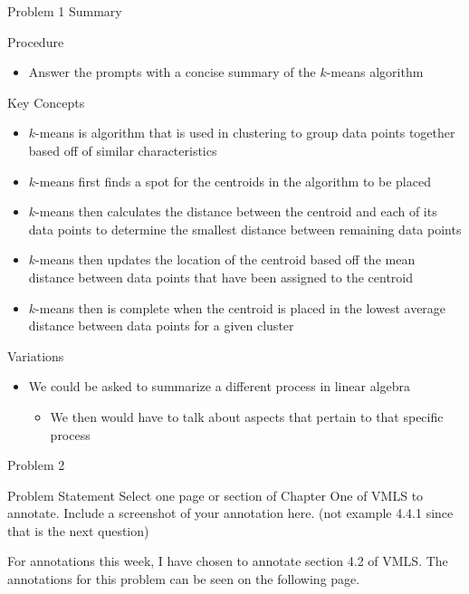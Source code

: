 \begin{summary}{Problem 1 Summary}
    \begin{statement}{Procedure}
        \begin{itemize}
            \item Answer the prompts with a concise summary of the $k$-means algorithm
        \end{itemize}
    \end{statement}
    \begin{statement}{Key Concepts}
        \begin{itemize}
            \item $k$-means is algorithm that is used in clustering to group data points together based off of similar characteristics
            \item $k$-means first finds a spot for the centroids in the algorithm to be placed
            \item $k$-means then calculates the distance between the centroid and each of its data points to determine the smallest distance between remaining data points
            \item $k$-means then updates the location of the centroid based off the mean distance between data points that have been assigned to the centroid
            \item $k$-means then is complete when the centroid is placed in the lowest average distance between data points for a given cluster
        \end{itemize}
    \end{statement}
    \begin{statement}{Variations}
        \begin{itemize}
            \item We could be asked to summarize a different process in linear algebra
            \begin{itemize}
                \item We then would have to talk about aspects that pertain to that specific process
            \end{itemize}
        \end{itemize}
    \end{statement}
\end{summary}

\begin{problem}{Problem 2}
    \begin{statement}{Problem Statement}
        Select one page or section of Chapter One of VMLS to annotate. Include a screenshot of your annotation here. (not example 4.4.1 since that is the next question)
    \end{statement}

    For annotations this week, I have chosen to annotate section 4.2 of VMLS. The annotations for this problem can be seen on the following page.

    
\end{problem}

